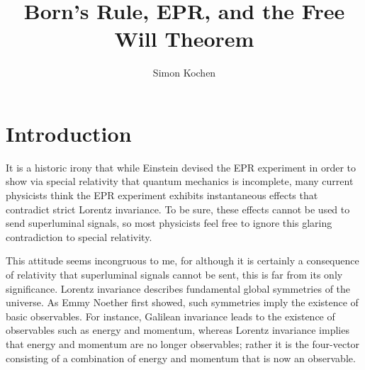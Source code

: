 \documentclass{article}
\title{Born's Rule, EPR, and the Free Will Theorem}
\author{Simon Kochen}
\begin{document}
   
   \maketitle
 
    \newcommand\cH{\mathcal{H}}
   \newcommand\cL{\mathcal{L}}
   \newcommand\rfl{\rotatebox{90}{$\rfloor$} }
   \newcommand\vp{\phi}
   \newcommand\tr{\mathop{\rm tr}\nolimits}
   \newcommand\Exp{\mathop{\rm Exp}\nolimits}
      \newcommand\Aut{\mathop{\rm Aut}\nolimits} 
   \newcommand\ssn[1]{\subsubsection*{#1}}
   \newcommand\R{\mathbb{R}}
   \newcommand\Ga{\Gamma}
   \newcommand\ga{\gamma}
      \newcommand\Q{\mathbb{Q}}
  \newcommand \lra[1]{\left\langle#1\right\rangle}
   \newcommand\la{\lambda}
   \newcommand\sig{\sigma}
   \newcommand\Om{\Omega}
   \newcommand\om{\omega}
    \newcommand\bpm{\begin{pmatrix}}
    \newcommand\epm{\end{pmatrix}}
   \newcommand\eps{\epsilon}
    \newcommand\bA{\mathbf{A}}
    \newcommand\bB{\mathbf{B}}
    \newcommand\ppsi{\psi} 
  \theoremstyle{definition}
\newtheorem*{defin}{Definition}
 
\section*{Introduction}

It is a historic irony that while Einstein devised the EPR experiment in order to show via special relativity that quantum mechanics is incomplete, many current physicists think the EPR experiment exhibits instantaneous effects that contradict strict Lorentz invariance. To be sure, these effects cannot be used to send superluminal signals, so most physicists feel free to ignore this glaring contradiction to special relativity.

This attitude seems incongruous to me, for although it is certainly a consequence of relativity that superluminal signals cannot be sent, this is far from its only significance. Lorentz invariance describes fundamental global symmetries of the universe. As Emmy Noether first showed, such symmetries imply the existence of basic observables. For instance, Galilean invariance leads to the existence of observables such as energy and momentum, whereas Lorentz invariance implies that energy and momentum are no longer observables; rather it is the four-vector consisting of a combination of energy and momentum that is now an observable.
\end{document}
